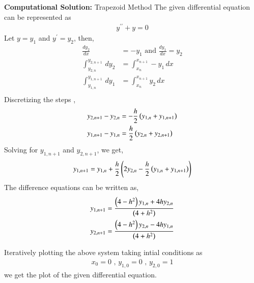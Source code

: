 \documentclass[journal]{IEEEtran}
\begin{document}
\textbf{Computational Solution:} Trapezoid Method
\newline
The given differential equation can be represented as 
\begin{align}
    y^{\prime\prime} + y = 0
\end{align}
Let $y = y_1$ and $y^{\prime} = y_2$, then, 
\begin{align}
    \frac{dy_2}{dx} &= -y_1 \text{ and } \frac{dy_1}{dx} = y_2\\
    \int_{y_{2, n}}^{y_{2, n + 1}} \, dy_2 &= \int_{x_n}^{x_{n + 1}} -y_1 \, dx\\
    \int_{y_{1, n}}^{y_{1, n + 1}} \, dy_1 &= \int_{x_n}^{x_{n + 1}} y_2 \, dx\\
\end{align}
Discretizing the steps ,
\begin{align}
    y_{2, n + 1} - y_{2, n} &= -\frac{h}{2}\left(y_{1, n} + y_{1, n + 1}\right)\\
    y_{1, n + 1} - y_{1, n} &= \frac{h}{2}\left(y_{2, n} + y_{2, n + 1}\right)
\end{align}
Solving for $y_{1, n + 1}$ and $y_{2, n + 1}$, we get,
\begin{align}
    y_{1, n + 1} = y_{1, n} + \frac{h}{2}\left(2y_{2, n} - \frac{h}{2}\left(y_{1, n} + y_{1, n + 1}\right)\right)\\
\end{align}
The difference equations can be written as,
\begin{align}
    y_{1, n + 1} = \frac{\left(4 - h^2\right)y_{1, n} + 4hy_{2, n}}{\left(4 + h^2\right)}\\
    y_{2, n + 1} = \frac{\left(4 - h^2\right)y_{2, n} - 4hy_{1, n}}{\left(4 + h^2\right)}\\
\end{align}

Iteratively plotting the above system taking intial conditions as 
\begin{align}
    x_0 = 0 \text{ , } y_{1, 0} = 0 \text{ , } y_{2, 0} = 1
\end{align}
we get the plot of the given differential equation.
\end{document}
